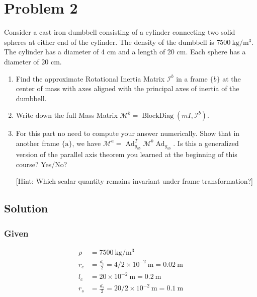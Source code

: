\section*{Problem 2}
\setcounter{section}{2}
\setcounter{equation}{0}

Consider a cast iron dumbbell consisting of a cylinder connecting two solid spheres at either end of the cylinder.
The density of the dumbbell is \( 7500 \mathrm{~kg} / \mathrm{m}^{3} \).
The cylinder has a diameter of 4 cm and a length of 20 cm.
Each sphere has a diameter of 20 cm.
\begin{enumerate}[label= (\alph*)]
    \item Find the approximate Rotational Inertia Matrix \( \mathcal{I}^{b} \) in a frame \( \{b\} \) at the center of mass with axes aligned with the principal axes of inertia of the dumbbell.

    \item Write down the full Mass Matrix \( \mathcal{M}^{b}=\operatorname{BlockDiag}\left(m I, \mathcal{I}^{b}\right) \).

    \item For this part no need to compute your answer numerically.
          Show that in another frame \( \{\mathrm{a}\} \), we have \( \mathcal{M}^{a}=\operatorname{Ad}_{g_{a b}}^{T} \mathcal{M}^{b} \operatorname{Ad}_{g_{a b}} \).
          Is this a generalized version of the parallel axis theorem you learned at the beginning of this course? Yes/No?

          [Hint: Which scalar quantity remains invariant under frame transformation?]
\end{enumerate}

\subsection*{Solution}

\subsubsection*{Given}

\begin{align*}
    \rho
     & =
    7500\mathrm{~kg} / \mathrm{m}^{3}
    \\
    r_{c}
     & =
    \frac{d_{c}}{2}
    =
    4 / 2 \times 10^{-2} \mathrm{~m}
    =
    0.02 \mathrm{~m}
    \\
    l_c
     & =
    20 \times 10^{-2} \mathrm{~m}
    =
    0.2 \mathrm{~m}
    \\
    r_{s}
     & =
    \frac{d_{s}}{2}
    =
    20 / 2 \times 10^{-2} \mathrm{~m}
    =
    0.1 \mathrm{~m}
\end{align*}

